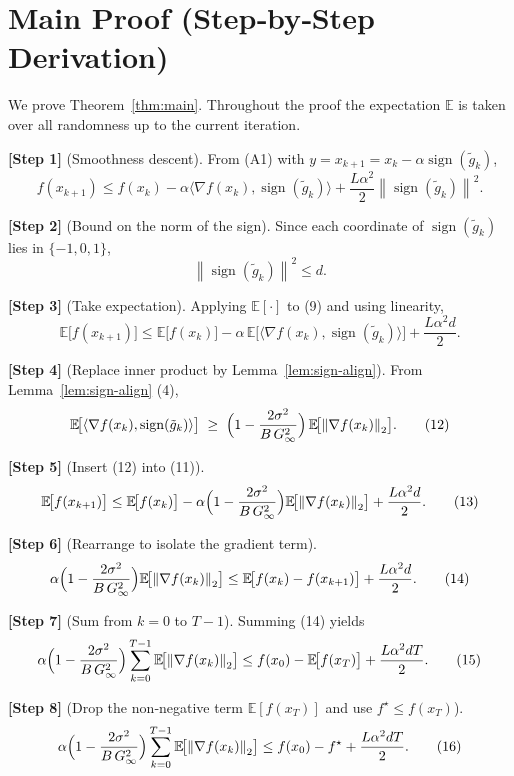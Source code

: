 \documentclass{article}
\newcommand{\sign}{\operatorname{sign}}
\newcommand{\EE}{\mathbb{E}}
\newcommand{\norm}[1]{\left\lVert#1\right\rVert}
\begin{document}
\section*{Main Proof (Step‑by‑Step Derivation)}
We prove Theorem~\ref{thm:main}.  Throughout the proof the expectation $\EE$ is taken over all randomness up to the current iteration.

\noindent\textbf{[Step 1]} (Smoothness descent).  
From (A1) with $y=x_{k+1}=x_{k}-\alpha\sign(\tilde g_{k})$,
\[
f(x_{k+1})\le f(x_{k})-\alpha\langle \nabla f(x_{k}),\sign(\tilde g_{k})\rangle
+\frac{L\alpha^{2}}{2}\norm{\sign(\tilde g_{k})}^{2}.
\tag{9}
\]

\noindent\textbf{[Step 2]} (Bound on the norm of the sign).  
Since each coordinate of $\sign(\tilde g_{k})$ lies in $\{-1,0,1\}$,
\[
\norm{\sign(\tilde g_{k})}^{2}\le d.
\tag{10}
\]

\noindent\textbf{[Step 3]} (Take expectation).  
Applying $\EE[\cdot]$ to (9) and using linearity,
\[
\EE\!\bigl[f(x_{k+1})\bigr]\le
\EE\!\bigl[f(x_{k})\bigr]
-\alpha\,\EE\!\bigl[\langle \nabla f(x_{k}),\sign(\tilde g_{k})\rangle\bigr]
+\frac{L\alpha^{2}d}{2}.
\tag{11}
\]

\noindent\textbf{[Step 4]} (Replace inner product by Lemma~\ref{lem:sign-align}).  
From Lemma~\ref{lem:sign-align} (4),
\[
\EE\!\bigl[\langle \nabla f(x_{k}),\sign(\tilde g_{k})\rangle\bigr]
\;\ge\;
\Bigl(1-\frac{2\sigma^{2}}{B\,G_{\infty}^{2}}\Bigr)\,
\EE\!\bigl[\norm{\nabla f(x_{k})}_{2}\bigr].
\tag{12}
\]

\noindent\textbf{[Step 5]} (Insert (12) into (11)).  
\[
\EE\!\bigl[f(x_{k+1})\bigr]\le
\EE\!\bigl[f(x_{k})\bigr]
-\alpha\Bigl(1-\frac{2\sigma^{2}}{B\,G_{\infty}^{2}}\Bigr)
\EE\!\bigl[\norm{\nabla f(x_{k})}_{2}\bigr]
+\frac{L\alpha^{2}d}{2}.
\tag{13}
\]

\noindent\textbf{[Step 6]} (Rearrange to isolate the gradient term).  
\[
\alpha\Bigl(1-\frac{2\sigma^{2}}{B\,G_{\infty}^{2}}\Bigr)
\EE\!\bigl[\norm{\nabla f(x_{k})}_{2}\bigr]
\le
\EE\!\bigl[f(x_{k})-f(x_{k+1})\bigr]
+\frac{L\alpha^{2}d}{2}.
\tag{14}
\]

\noindent\textbf{[Step 7]} (Sum from $k=0$ to $T-1$).  
Summing (14) yields
\[
\alpha\Bigl(1-\frac{2\sigma^{2}}{B\,G_{\infty}^{2}}\Bigr)
\sum_{k=0}^{T-1}\EE\!\bigl[\norm{\nabla f(x_{k})}_{2}\bigr]
\le
f(x_{0})- \EE\!\bigl[f(x_{T})\bigr]
+\frac{L\alpha^{2}dT}{2}.
\tag{15}
\]

\noindent\textbf{[Step 8]} (Drop the non‑negative term $\EE[f(x_{T})]$ and use $f^{\star}\le f(x_{T})$).  
\[
\alpha\Bigl(1-\frac{2\sigma^{2}}{B\,G_{\infty}^{2}}\Bigr)
\sum_{k=0}^{T-1}\EE\!\bigl[\norm{\nabla f(x_{k})}_{2}\bigr]
\le
f(x_{0})-f^{\star}
+\frac{L\alpha^{2}dT}{2}.
\tag{16}
\]
\end{document}
